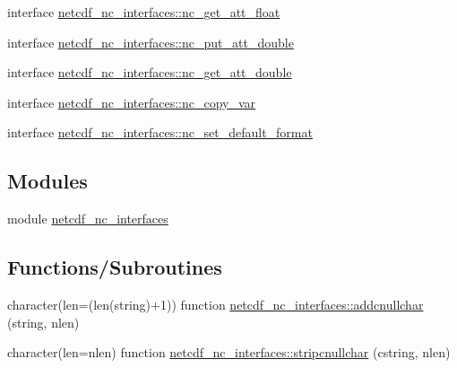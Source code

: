 \begin{DoxyCompactItemize}
interface \hyperlink{interfacenetcdf__nc__interfaces_1_1nc__get__att__float}{netcdf\+\_\+nc\+\_\+interfaces\+::nc\+\_\+get\+\_\+att\+\_\+float}
\item 
interface \hyperlink{interfacenetcdf__nc__interfaces_1_1nc__put__att__double}{netcdf\+\_\+nc\+\_\+interfaces\+::nc\+\_\+put\+\_\+att\+\_\+double}
\item 
interface \hyperlink{interfacenetcdf__nc__interfaces_1_1nc__get__att__double}{netcdf\+\_\+nc\+\_\+interfaces\+::nc\+\_\+get\+\_\+att\+\_\+double}
\item 
interface \hyperlink{interfacenetcdf__nc__interfaces_1_1nc__copy__var}{netcdf\+\_\+nc\+\_\+interfaces\+::nc\+\_\+copy\+\_\+var}
\item 
interface \hyperlink{interfacenetcdf__nc__interfaces_1_1nc__set__default__format}{netcdf\+\_\+nc\+\_\+interfaces\+::nc\+\_\+set\+\_\+default\+\_\+format}
\end{DoxyCompactItemize}
\subsection*{Modules}
\begin{DoxyCompactItemize}
\item 
module \hyperlink{namespacenetcdf__nc__interfaces}{netcdf\+\_\+nc\+\_\+interfaces}
\end{DoxyCompactItemize}
\subsection*{Functions/\+Subroutines}
\begin{DoxyCompactItemize}
\item 
character(len=(len(string)+1)) function \hyperlink{namespacenetcdf__nc__interfaces_ad9d3a194b1b034d3dd647248ad0eed04}{netcdf\+\_\+nc\+\_\+interfaces\+::addcnullchar} (string, nlen)
\item 
character(len=nlen) function \hyperlink{namespacenetcdf__nc__interfaces_a2354fd83a30b4ba3b0e9d81003debc5a}{netcdf\+\_\+nc\+\_\+interfaces\+::stripcnullchar} (cstring, nlen)
\end{DoxyCompactItemize}
